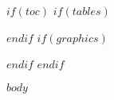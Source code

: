 \documentclass[11pt,a4paper]{article}
\begin{document}
$if(toc)$
\tableofcontents
$if(tables)$
\listoftables
$endif$
$if(graphics)$
\listoffigures
$endif$
\pagebreak
$endif$

$body$
\end{document}
